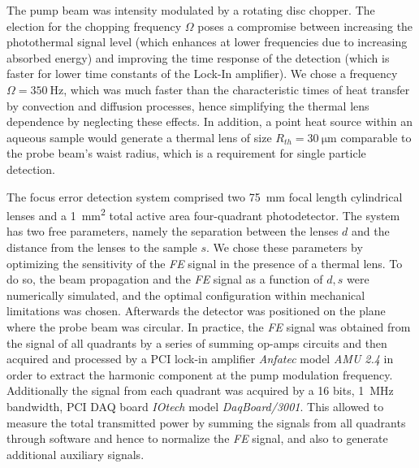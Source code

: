 \documentclass[9pt,twocolumn,twoside]{osajnl}
\newcommand{\FE}{\textit{FE}}
\begin{document}
The pump beam was intensity modulated by a rotating disc chopper. The election for the chopping frequency $\Omega$ poses a compromise between increasing the photothermal signal level (which enhances at lower frequencies due to increasing absorbed energy) and improving the time response of the detection (which is faster for lower time constants of the Lock-In amplifier). We chose a frequency $\Omega = \SI{350}{\hertz}$, which was much faster than the characteristic times of heat transfer by convection and diffusion processes, hence simplifying the thermal lens dependence by neglecting these effects. In addition, a point heat source within an aqueous sample would generate a thermal lens of size $R_{th} = \SI{30}{\micro\metre}$ comparable to the probe beam's waist radius, which is a requirement for single particle detection.



The focus error detection system comprised two \SI{75}{\milli\metre} focal length cylindrical lenses and a \SI{1}{\milli\metre^2} total active area four-quadrant photodetector. The system has two free parameters, namely the separation between the lenses $d$ and the distance from the lenses to the sample $s$. We chose these parameters by optimizing the sensitivity of the \FE{} signal in the presence of a thermal lens. To do so, the beam propagation and the \FE{} signal as a function of ${d,s}$ were numerically simulated, and the optimal configuration within mechanical limitations was chosen. Afterwards the detector was positioned on the plane where the probe beam was circular. In practice, the \FE{} signal was obtained from the signal of all quadrants by a series of summing op-amps circuits and then acquired and processed by a PCI lock-in amplifier \emph{Anfatec} model \emph{AMU 2.4} in order to extract the harmonic component at the pump modulation frequency. Additionally the signal from each quadrant was acquired by a 16 bits, \SI{1}{\mega\hertz} bandwidth, PCI DAQ board \emph{IOtech} model \emph{DaqBoard/3001}. This allowed to measure the total transmitted power by summing the signals from all quadrants through software and hence to normalize the \FE{} signal, and also to generate additional auxiliary signals. \\
\end{document}
